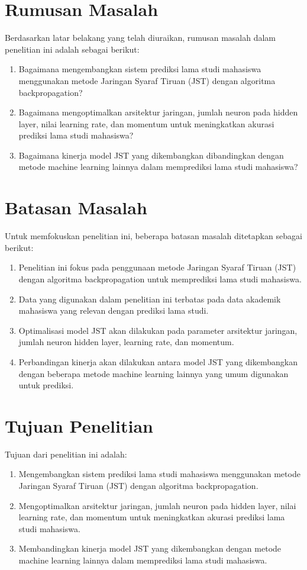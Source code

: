\section{Rumusan Masalah}
Berdasarkan latar belakang yang telah diuraikan, rumusan masalah dalam penelitian ini adalah sebagai berikut:
    \begin{enumerate}
        \item Bagaimana mengembangkan sistem prediksi lama studi mahasiswa menggunakan metode Jaringan Syaraf Tiruan (JST) dengan algoritma backpropagation?
        \item Bagaimana mengoptimalkan arsitektur jaringan, jumlah neuron pada hidden layer, nilai learning rate, dan momentum untuk meningkatkan akurasi prediksi lama studi mahasiswa?
        \item Bagaimana kinerja model JST yang dikembangkan dibandingkan dengan metode machine learning lainnya dalam memprediksi lama studi mahasiswa?
    \end{enumerate}

\section{Batasan Masalah}
Untuk memfokuskan penelitian ini, beberapa batasan masalah ditetapkan sebagai berikut:
    \begin{enumerate}
        \item Penelitian ini fokus pada penggunaan metode Jaringan Syaraf Tiruan (JST) dengan algoritma backpropagation untuk memprediksi lama studi mahasiswa.
        \item Data yang digunakan dalam penelitian ini terbatas pada data akademik mahasiswa yang relevan dengan prediksi lama studi.
        \item Optimalisasi model JST akan dilakukan pada parameter arsitektur jaringan, jumlah neuron hidden layer, learning rate, dan momentum.
        \item Perbandingan kinerja akan dilakukan antara model JST yang dikembangkan dengan beberapa metode machine learning lainnya yang umum digunakan untuk prediksi.
    \end{enumerate}

\section{Tujuan Penelitian}
Tujuan dari penelitian ini adalah:
    \begin{enumerate}
        \item Mengembangkan sistem prediksi lama studi mahasiswa menggunakan metode Jaringan Syaraf Tiruan (JST) dengan algoritma backpropagation.
        \item Mengoptimalkan arsitektur jaringan, jumlah neuron pada hidden layer, nilai learning rate, dan momentum untuk meningkatkan akurasi prediksi lama studi mahasiswa.
        \item Membandingkan kinerja model JST yang dikembangkan dengan metode machine learning lainnya dalam memprediksi lama studi mahasiswa.
    \end{enumerate}


